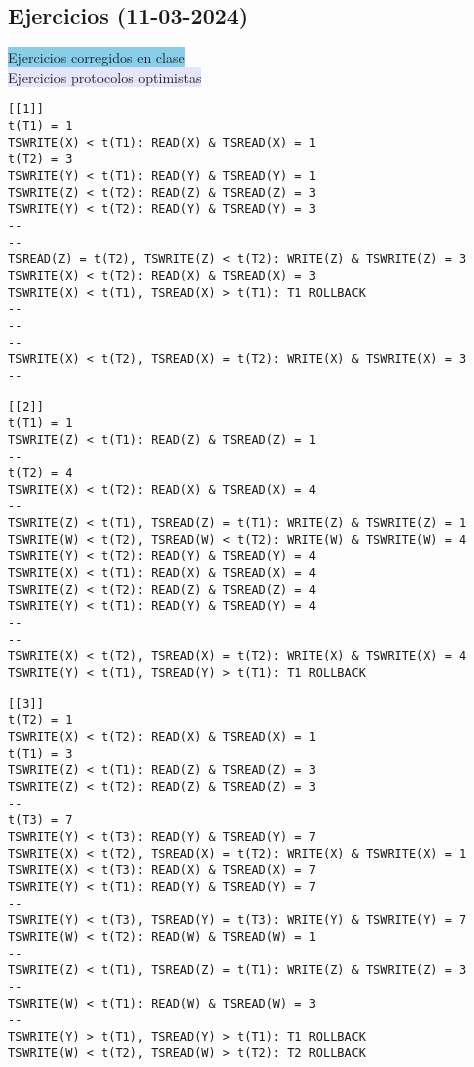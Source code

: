 \documentclass{article}
\begin{document}
\subsection{Ejercicios (11-03-2024)}
\colorbox{SkyBlue}{Ejercicios corregidos en clase}\\
\colorbox{Lavender}{Ejercicios protocolos optimistas}
\begin{verbatim}
[[1]]
t(T1) = 1
TSWRITE(X) < t(T1): READ(X) & TSREAD(X) = 1
t(T2) = 3
TSWRITE(Y) < t(T1): READ(Y) & TSREAD(Y) = 1
TSWRITE(Z) < t(T2): READ(Z) & TSREAD(Z) = 3
TSWRITE(Y) < t(T2): READ(Y) & TSREAD(Y) = 3
--
--
TSREAD(Z) = t(T2), TSWRITE(Z) < t(T2): WRITE(Z) & TSWRITE(Z) = 3
TSWRITE(X) < t(T2): READ(X) & TSREAD(X) = 3
TSWRITE(X) < t(T1), TSREAD(X) > t(T1): T1 ROLLBACK
--
--
--
TSWRITE(X) < t(T2), TSREAD(X) = t(T2): WRITE(X) & TSWRITE(X) = 3
--
\end{verbatim}
\begin{verbatim}
[[2]]
t(T1) = 1
TSWRITE(Z) < t(T1): READ(Z) & TSREAD(Z) = 1
--
t(T2) = 4
TSWRITE(X) < t(T2): READ(X) & TSREAD(X) = 4
--
TSWRITE(Z) < t(T1), TSREAD(Z) = t(T1): WRITE(Z) & TSWRITE(Z) = 1
TSWRITE(W) < t(T2), TSREAD(W) < t(T2): WRITE(W) & TSWRITE(W) = 4
TSWRITE(Y) < t(T2): READ(Y) & TSREAD(Y) = 4
TSWRITE(X) < t(T1): READ(X) & TSREAD(X) = 4
TSWRITE(Z) < t(T2): READ(Z) & TSREAD(Z) = 4
TSWRITE(Y) < t(T1): READ(Y) & TSREAD(Y) = 4
--
--
TSWRITE(X) < t(T2), TSREAD(X) = t(T2): WRITE(X) & TSWRITE(X) = 4
TSWRITE(Y) < t(T1), TSREAD(Y) > t(T1): T1 ROLLBACK
\end{verbatim}
\begin{verbatim}
[[3]]
t(T2) = 1
TSWRITE(X) < t(T2): READ(X) & TSREAD(X) = 1
t(T1) = 3
TSWRITE(Z) < t(T1): READ(Z) & TSREAD(Z) = 3
TSWRITE(Z) < t(T2): READ(Z) & TSREAD(Z) = 3
--
t(T3) = 7
TSWRITE(Y) < t(T3): READ(Y) & TSREAD(Y) = 7
TSWRITE(X) < t(T2), TSREAD(X) = t(T2): WRITE(X) & TSWRITE(X) = 1
TSWRITE(X) < t(T3): READ(X) & TSREAD(X) = 7
TSWRITE(Y) < t(T1): READ(Y) & TSREAD(Y) = 7
--
TSWRITE(Y) < t(T3), TSREAD(Y) = t(T3): WRITE(Y) & TSWRITE(Y) = 7
TSWRITE(W) < t(T2): READ(W) & TSREAD(W) = 1
--
TSWRITE(Z) < t(T1), TSREAD(Z) = t(T1): WRITE(Z) & TSWRITE(Z) = 3
--
TSWRITE(W) < t(T1): READ(W) & TSREAD(W) = 3
--
TSWRITE(Y) > t(T1), TSREAD(Y) > t(T1): T1 ROLLBACK
TSWRITE(W) < t(T2), TSREAD(W) > t(T2): T2 ROLLBACK
\end{verbatim}
\end{document}
